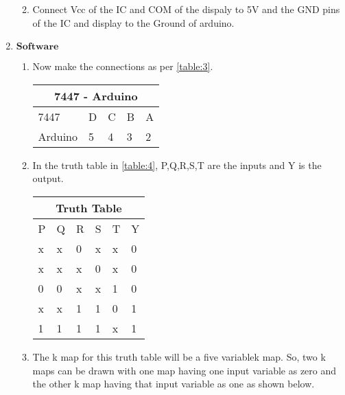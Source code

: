 \documentclass{article}
\begin{document}
\begin{enumerate}
\begin{enumerate}
\begin{tabular}{|p{3cm}|p{1cm}|p{1cm}|p{1cm}|p{1cm}|p{1cm}|p{1cm}|p{1cm}|}
					\hline
				\end{tabular}
				\newline
			\item Connect Vcc of the IC and COM of the dispaly to 5V and the GND pins of the IC and display to the Ground of arduino.
		\end{enumerate}
	\item $\textbf{Software}$
		\begin{enumerate}
			\item Now make the connections as per \ref{table:3}.
				\newline{}\label{table:3}\begin{tabular}{|p{3cm}|p{1cm}|p{1cm}|p{1cm}|p{1cm}|}
					\hline
					\multicolumn{5}{|c|}{7447 - Arduino}\\
					\hline
					7447& D& C& B& A\\
					\hline
					Arduino& 5& 4& 3& 2\\
					\hline
				\end{tabular}
				\newline
			\item In the truth table in \ref{table:4}, P,Q,R,S,T are the inputs and Y is the output.
				\newline{}\label{table:4}\begin{tabular}{|p{1cm}|p{1cm}|p{1cm}|p{1cm}|p{1cm}|p{1cm}|}
					\hline
					\multicolumn{6}{|c|}{Truth Table}\\
					\hline
					P& Q& R& S& T& Y\\
					\hline
					x& x& 0& x& x& 0\\
					\hline
					x& x& x& 0& x& 0\\
					\hline
					0& 0& x& x& 1& 0\\
					\hline
					x& x& 1& 1& 0& 1\\
					\hline
					1& 1& 1& 1& x& 1\\
					\hline
				\end{tabular}
			\newline\item The k map for this truth table will be a five variablek map. So, two k maps can be drawn with one map having one input variable as zero and the other k map having that input variable as one as shown below.
				\newline\begin{karnaugh-map}[4][4][2][$T$][$S$][$R$][$Q$][$P$]
					\autoterms[0]

\end{karnaugh-map}
\end{enumerate}
\end{enumerate}
\end{document}
